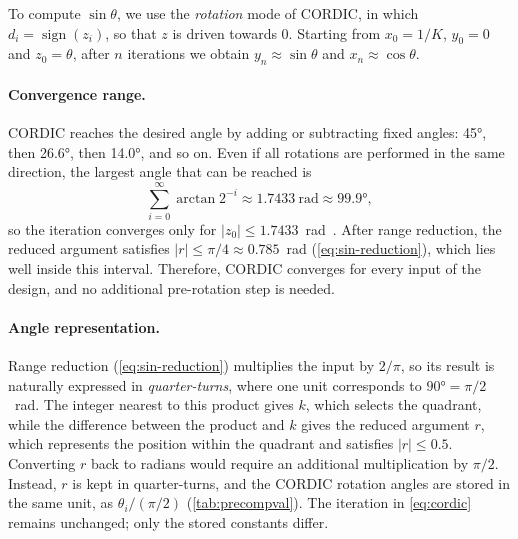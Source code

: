 To compute $\sin \theta$, we use the \emph{rotation} mode of CORDIC, in which $d_{i} = \operatorname{sign}(z_{i})$, so that $z$ is driven towards $0$. Starting from $x_{0} = 1/K$, $y_{0} = 0$ and $z_{0} = \theta$, after $n$ iterations we obtain $y_{n} \approx \sin\theta$ and $x_{n} \approx \cos\theta$.

\paragraph{Convergence range.}
CORDIC reaches the desired angle by adding or subtracting fixed angles:
\ang{45}, then \ang{26.6}, then \ang{14.0}, and so on. Even if all rotations
are performed in the same direction, the largest angle that can be reached is
\begin{equation}
  \sum_{i=0}^{\infty} \arctan 2^{-i} \approx \SI{1.7433}{\radian}
  \approx \ang{99.9},
  \label{eq:cordic-convergence}
\end{equation}
so the iteration converges only for $|z_{0}| \le 1.7433$~rad~\cite{muller2020}.
After range reduction, the reduced argument satisfies $|r| \le \pi/4 \approx
0.785$~rad (\cref{eq:sin-reduction}), which lies well inside this interval.
Therefore, CORDIC converges for every input of the design, and no additional
pre-rotation step is needed.

\paragraph{Angle representation.}
Range reduction (\cref{eq:sin-reduction}) multiplies the input by $2/\pi$, so
its result is naturally expressed in \emph{quarter-turns}, where one unit
corresponds to $\ang{90} = \pi/2$~rad. The integer nearest to this product gives $k$, which selects the quadrant,
while the difference between the product and $k$ gives the reduced argument
$r$, which represents the position within the quadrant and satisfies
$|r| \le 0.5$. Converting $r$ back to radians would require an additional
multiplication by $\pi/2$. Instead, $r$ is kept in quarter-turns, and the
CORDIC rotation angles are stored in the same unit, as
$\theta_{i} / (\pi/2)$ (\cref{tab:precompval}). The iteration in
\cref{eq:cordic} remains unchanged; only the stored constants differ.

